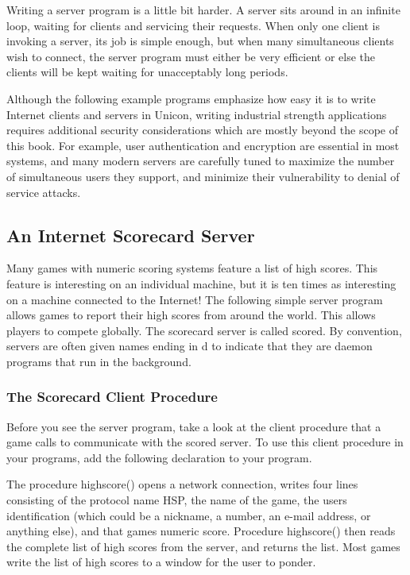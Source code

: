 Writing a server program is a little bit harder. A server sits around in
an infinite loop, waiting for clients and servicing their requests.
When only one client is invoking a server, its job is simple enough,
but when many simultaneous clients wish to connect, the server program
must either be very efficient or else the clients will be kept waiting
for unacceptably long periods.

Although the following example programs emphasize how easy it is to
write Internet clients and servers in Unicon, writing
{\textquotedbl}industrial strength{\textquotedbl} applications requires
additional security considerations which are mostly beyond the scope of
this book. For example, user authentication and encryption are
essential in most systems, and many modern servers are carefully tuned
to maximize the number of simultaneous users they support, and minimize
their vulnerability to denial of service attacks.

\subsection{An Internet Scorecard Server}

Many games with numeric scoring systems feature a list of high scores.
This feature is interesting on an individual machine, but it is ten
times as interesting on a machine connected to the Internet! The
following simple server program allows games to report
their high scores from around the world. This allows players to compete
globally. The scorecard server is called \textsf{scored}. By
convention, servers are often given names ending in
{\textquotedbl}d{\textquotedbl} to indicate that they are daemon
programs that run in the background.

\subsubsection{The Scorecard Client Procedure}

Before you see the server program, take a look at the client procedure
that a game calls to communicate with the \textsf{scored} server. To
use this client procedure in your programs, add the following
declaration to your program.


The procedure \textsf{highscore()} opens a network connection, writes
four lines consisting of the protocol name
{\textquotedbl}HSP{\textquotedbl}, the name of the game, the
user{\textquotesingle}s identification (which could be a nickname, a
number, an e-mail address, or anything else), and that
game{\textquotesingle}s numeric score. Procedure \textsf{highscore()}
then reads the complete list of high scores from the server, and
returns the list. Most games write the list of high scores to a window
for the user to ponder.

